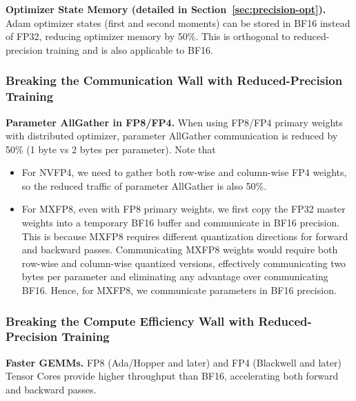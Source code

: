 \documentclass[10pt,logo,copyright]{nvidiatechreport}
\begin{document}
\textbf{Optimizer State Memory (detailed in Section~\ref{sec:precision-opt}).} Adam optimizer states (first and second moments) can be stored in BF16 instead of FP32, reducing optimizer memory by 50\%. This is orthogonal to reduced-precision training and is also applicable to BF16.

\subsubsection{Breaking the Communication Wall with Reduced-Precision Training}
\label{sec:comm_wall_quantized_training}


\textbf{Parameter AllGather in FP8/FP4.} When using FP8/FP4 primary weights with distributed optimizer, parameter AllGather communication is reduced by 50\% (1 byte vs 2 bytes per parameter). Note that
\begin{itemize}
    \item For NVFP4, we need to gather both row-wise and column-wise FP4 weights, so the reduced traffic of parameter AllGather is also 50\%.
    \item For MXFP8, even with FP8 primary weights, we first copy the FP32 master weights into a temporary BF16 buffer and communicate in BF16 precision. This is because MXFP8 requires different quantization directions for forward and backward passes. Communicating MXFP8 weights would require both row-wise and column-wise quantized versions, effectively communicating two bytes per parameter and eliminating any advantage over communicating BF16. Hence, for MXFP8, we communicate parameters in BF16 precision. 
\end{itemize}

\subsubsection{Breaking the Compute Efficiency Wall with Reduced-Precision Training}

\textbf{Faster GEMMs.} FP8 (Ada/Hopper and later) and FP4 (Blackwell and later) Tensor Cores provide higher throughput than BF16, accelerating both forward and backward passes.
\end{document}
